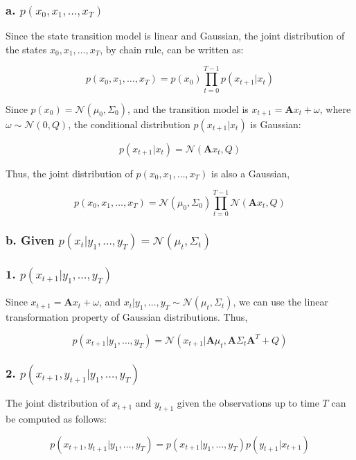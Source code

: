 \documentclass[12pt]{article}
\begin{document}
\begin{itemize}
\subsubsection*{a. \textbf{\( p(x_0, x_1, \dots, x_T) \)}}

Since the state transition model is linear and Gaussian, the joint distribution of the states \( x_0, x_1, \dots, x_T \), by chain rule, can be written as:

\[
p(x_0, x_1, \dots, x_T) = p(x_0) \prod_{t=0}^{T-1} p(x_{t+1} | x_t)
\]

Since \( p(x_0) = \mathcal{N}(\mu_0, \Sigma_0) \), and the transition model is \( x_{t+1} = \mathbf{A} x_t + \omega \), where \( \omega \sim \mathcal{N}(0, Q) \), the conditional distribution \( p(x_{t+1} | x_t) \) is Gaussian:

\[
p(x_{t+1} | x_t) = \mathcal{N}(\mathbf{A} x_t, Q)
\]

Thus, the joint distribution of \( p(x_0, x_1, \dots, x_T) \) is also a Gaussian, 

\[
p(x_0, x_1, \dots, x_T) = \mathcal{N}(\mu_0, \Sigma_0) \prod_{t=0}^{T-1} \mathcal{N}(\mathbf{A} x_t, Q)
\]

\subsubsection*{b. \textbf{Given} \( p(x_t | y_1, \dots, y_T) = \mathcal{N}(\mu_t, \Sigma_t) \)}

\subsubsection*{1. \( p(x_{t+1} | y_1, \dots, y_T) \)}

Since \( x_{t+1} = \mathbf{A} x_t + \omega \), and \( x_t | y_1, \dots, y_T \sim \mathcal{N}(\mu_t, \Sigma_t) \), we can use the linear transformation property of Gaussian distributions. Thus, 

\[
p(x_{t+1} | y_1, \dots, y_T) = \mathcal{N}(x_{t+1} |\mathbf{A} \mu_t, \mathbf{A} \Sigma_t \mathbf{A}^T + Q)
\]

\subsubsection*{2. \( p(x_{t+1}, y_{t+1} | y_1, \dots, y_T) \)}

The joint distribution of \( x_{t+1} \) and \( y_{t+1} \) given the observations up to time \( T \) can be computed as follows:

\[
p(x_{t+1}, y_{t+1} | y_1, \dots, y_T) = p(x_{t+1} | y_1, \dots, y_T) p(y_{t+1} | x_{t+1})
\]


\end{itemize}
\end{document}
